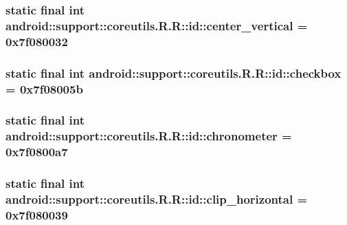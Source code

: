 \hypertarget{classandroid_1_1support_1_1coreutils_1_1_r_1_1id_6d2e6e8e9e993d9b09625553c025e224}{
\subsubsection[{center\_\-vertical}]{\setlength{\rightskip}{0pt plus 5cm}static final int android::support::coreutils.R.R::id::center\_\-vertical = 0x7f080032}}
\label{classandroid_1_1support_1_1coreutils_1_1_r_1_1id_6d2e6e8e9e993d9b09625553c025e224}


\hypertarget{classandroid_1_1support_1_1coreutils_1_1_r_1_1id_993618b795e0f8076f45dc2d59d5f837}{
\subsubsection[{checkbox}]{\setlength{\rightskip}{0pt plus 5cm}static final int android::support::coreutils.R.R::id::checkbox = 0x7f08005b}}
\label{classandroid_1_1support_1_1coreutils_1_1_r_1_1id_993618b795e0f8076f45dc2d59d5f837}


\hypertarget{classandroid_1_1support_1_1coreutils_1_1_r_1_1id_440aea52c60c56483acba0108db0cddd}{
\subsubsection[{chronometer}]{\setlength{\rightskip}{0pt plus 5cm}static final int android::support::coreutils.R.R::id::chronometer = 0x7f0800a7}}
\label{classandroid_1_1support_1_1coreutils_1_1_r_1_1id_440aea52c60c56483acba0108db0cddd}


\hypertarget{classandroid_1_1support_1_1coreutils_1_1_r_1_1id_43bbe3e6d65f0f41143d8b0f8cf497de}{
\subsubsection[{clip\_\-horizontal}]{\setlength{\rightskip}{0pt plus 5cm}static final int android::support::coreutils.R.R::id::clip\_\-horizontal = 0x7f080039}}
\label{classandroid_1_1support_1_1coreutils_1_1_r_1_1id_43bbe3e6d65f0f41143d8b0f8cf497de}


